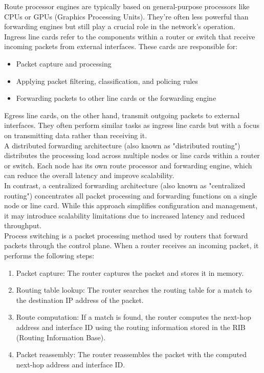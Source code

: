 \documentclass{article}
\begin{document}
Route processor engines are typically based on general-purpose processors like CPUs or GPUs (Graphics Processing Units). They're often less powerful than forwarding engines but still play a crucial role in the network's operation.\\

Ingress line cards refer to the components within a router or switch that receive incoming packets from external interfaces. These cards are responsible for:
	\begin{itemize}
		\item  Packet capture and processing 
		\item  Applying packet filtering, classification, and policing rules 
		\item  Forwarding packets to other line cards or the forwarding engine 
	\end{itemize}

Egress line cards, on the other hand, transmit outgoing packets to external interfaces. They often perform similar tasks as ingress line cards but with a focus on transmitting data rather than receiving it.\\

A distributed forwarding architecture (also known as "distributed routing") distributes the processing load across multiple nodes or line cards within a router or switch. Each node has its own route processor and forwarding engine, which can reduce the overall latency and improve scalability.\\

In contrast, a centralized forwarding architecture (also known as "centralized routing") concentrates all packet processing and forwarding functions on a single node or line card. While this approach simplifies configuration and management, it may introduce scalability limitations due to increased latency and reduced throughput.\\

Process switching is a packet processing method used by routers that forward packets through the control plane. When a 
router receives an incoming packet, it performs the following steps:
	\begin{enumerate}
		\item Packet capture: The router captures the packet and stores it in memory.
		\item Routing table lookup: The router searches the routing table for a match to the destination IP address of the packet.
		\item Route computation: If a match is found, the router computes the next-hop address and interface ID using the routing information stored in the RIB (Routing Information Base).
		\item Packet reassembly: The router reassembles the packet with the computed next-hop address and interface ID.
	\end{enumerate}
\end{document}
